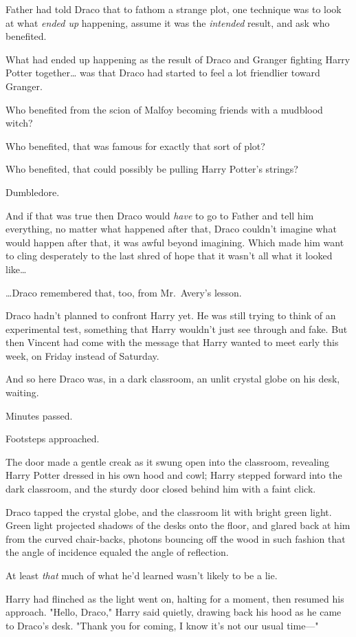 Father had told Draco that to fathom a strange plot, one technique was to look 
at what \emph{ended up} happening, assume it was the \emph{intended} result, 
and ask who benefited.

What had ended up happening as the result of Draco and Granger fighting Harry 
Potter together{\ldots} was that Draco had started to feel a lot friendlier 
toward Granger.

Who benefited from the scion of Malfoy becoming friends with a mudblood witch?

Who benefited, that was famous for exactly that sort of plot?

Who benefited, that could possibly be pulling Harry Potter's strings?

Dumbledore.

And if that was true then Draco would \emph{have} to go to Father and tell him 
everything, no matter what happened after that, Draco couldn't imagine what 
would happen after that, it was awful beyond imagining. Which made him want to 
cling desperately to the last shred of hope that it wasn't all what it looked 
like{\ldots}

{\ldots}Draco remembered that, too, from Mr.~Avery's lesson.

Draco hadn't planned to confront Harry yet. He was still trying to think of an 
experimental test, something that Harry wouldn't just see through and fake. But 
then Vincent had come with the message that Harry wanted to meet early this 
week, on Friday instead of Saturday.

And so here Draco was, in a dark classroom, an unlit crystal globe on his desk, 
waiting.

Minutes passed.

Footsteps approached.

The door made a gentle creak as it swung open into the classroom, revealing 
Harry Potter dressed in his own hood and cowl; Harry stepped forward into the 
dark classroom, and the sturdy door closed behind him with a faint click.

Draco tapped the crystal globe, and the classroom lit with bright green light. 
Green light projected shadows of the desks onto the floor, and glared back at 
him from the curved chair-backs, photons bouncing off the wood in such fashion 
that the angle of incidence equaled the angle of reflection.

At least \emph{that} much of what he'd learned wasn't likely to be a lie.

Harry had flinched as the light went on, halting for a moment, then resumed his 
approach. "Hello, Draco," Harry said quietly, drawing back his hood as he came 
to Draco's desk. "Thank you for coming, I know it's not our usual time---"

